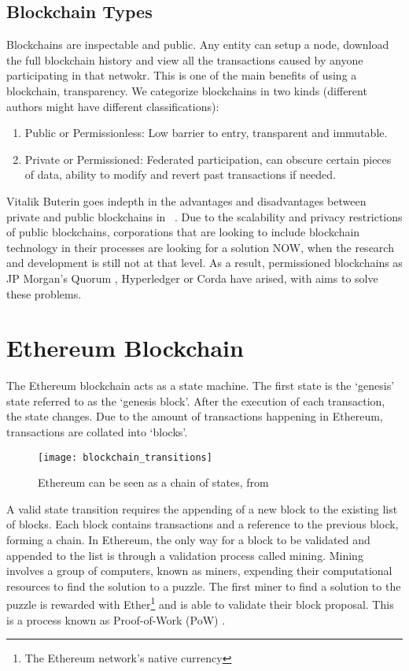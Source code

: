 \subsection{Blockchain Types}
Blockchains are inspectable and public. Any entity can setup a node, download the full blockchain history and view all the transactions caused by anyone participating in that netwokr. This is one of the main benefits of using a blockchain, transparency.
We categorize blockchains in two kinds (different authors might have different classifications):
\begin{enumerate}
    \item Public or Permissionless: Low barrier to entry, transparent and immutable.
    \item Private or Permissioned: Federated participation, can obscure certain pieces of data, ability to modify and revert past transactions if needed.
\end{enumerate}

Vitalik Buterin goes indepth in the advantages and disadvantages between private and public blockchains in ~\cite{publicprivate}. Due to the scalability and privacy restrictions of public blockchains, corporations that are looking to include blockchain technology in their processes are looking for a solution NOW, when the research and development is still not at that level. As a result, permissioned blockchains as JP Morgan's Quorum \cite{quorum}, Hyperledger or Corda have arised, with aims to solve these problems.

\section{Ethereum Blockchain}
The Ethereum blockchain acts as a state machine. The first state is the `genesis' state referred to as the `genesis block'. After the execution of each transaction, the state changes. Due to the amount of transactions happening in Ethereum, transactions are collated into `blocks'. 

\begin{figure}[H]
    \centering
    \texttt{[image: blockchain\_transitions]}
    \caption{Ethereum can be seen as a chain of states, from \cite{visual}}
    \label{fig:worldstate_update}
\end{figure}

A valid state transition requires the appending of a new block to the existing list of blocks. Each block contains transactions and a reference to the previous block, forming a chain. In Ethereum, the only way for a block to be validated and appended to the list is through a validation process called mining. Mining involves a group of computers, known as miners, expending their computational resources to find the solution to a puzzle. The first miner to find a solution to the puzzle is rewarded with Ether\footnote{The Ethereum network's native currency} and is able to validate their block proposal. This is a process known as Proof-of-Work (PoW) \cite{pow}. 

